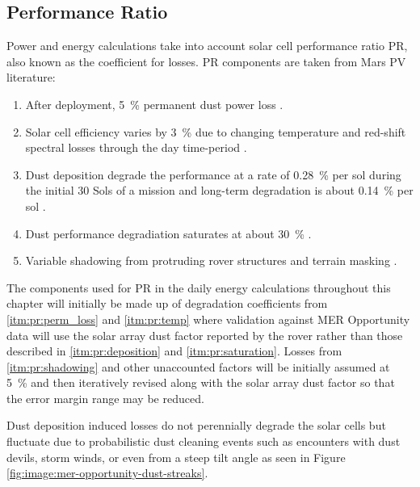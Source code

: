 
\subsection{Performance Ratio}
\label{sec:PowerAndEnergyPredictions:PerformanceRatio}
Power and energy calculations take into account solar cell performance ratio \ac{PR}, also known as the coefficient for losses. \ac{PR} components are taken from Mars \ac{PV} literature:

\begin{enumerate}[label=\textbf{\textcolor{BulletBlue}{(\alph*)}}]
  \item\label{itm:pr:perm_loss}After deployment, \SI{5}{\percent} permanent dust power loss .
  \item\label{itm:pr:temp}Solar cell efficiency varies by \SI{3}{\percent} due to changing temperature and red-shift spectral losses through the day time-period .
  \item\label{itm:pr:deposition}Dust deposition degrade the performance at a rate of \SI{0.28}{\percent} per sol during the initial 30 Sols of a mission and long-term degradation is about \SI{0.14}{\percent} per sol .
  \item\label{itm:pr:saturation}Dust performance degradiation saturates at about \SI{30}{\percent} .
  \item\label{itm:pr:shadowing}Variable shadowing from protruding rover structures  and terrain masking .
\end{enumerate}

The components used for \ac{PR} in the daily energy calculations throughout this chapter will initially be made up of degradation coefficients from \ref{itm:pr:perm_loss} and \ref{itm:pr:temp} where validation against \ac{MER} Opportunity data will use the solar array dust factor reported by the rover rather than those described in \ref{itm:pr:deposition} and \ref{itm:pr:saturation}. Losses from \ref{itm:pr:shadowing} and other unaccounted factors will be initially assumed at \SI{5}{\percent} and then iteratively revised along with the solar array dust factor so that the error margin range may be reduced.

Dust deposition induced losses do not perennially degrade the solar cells but fluctuate due to probabilistic dust cleaning events such as encounters with dust devils, storm winds, or even from a steep tilt angle as seen in Figure \ref{fig:image:mer-opportunity-dust-streaks}.

